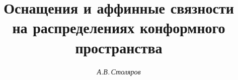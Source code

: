 

 


%  


 


\newcommand{\eqdef}{\overset{\mathrm{def}}{=}{}} 


\newcommand{\up}[2]{\overset{#1}{#2}{}} 


\newcommand{\tts}[1]{} 


 




\setcounter{page}{52} 












 


\author{\it А.В.\,Столяров} 




\title{Оснащения и аффинные связности \\ 


на распределениях конформного пространства} 


 


\date{} 




\pagestyle{plain} %


 




\maketitle 


